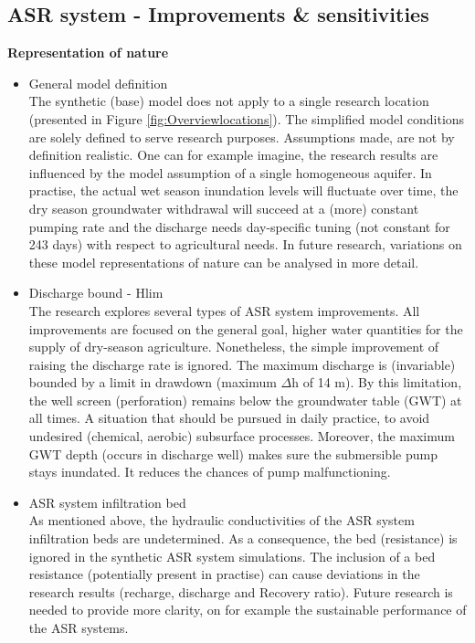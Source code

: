 \subsection{ASR system - Improvements \& sensitivities} 
\textbf{Representation of nature}
\begin{itemize}
\item{General model definition} \\
The synthetic (base) model does not apply to a single research location (presented in Figure \ref{fig:Overviewlocations}). The simplified model conditions are solely defined to serve research purposes. Assumptions made, are not by definition realistic. One can for example imagine, the research results are influenced by the model assumption of a single homogeneous aquifer. In practise, the actual wet season inundation levels will fluctuate over time, the dry season groundwater withdrawal will succeed at a (more) constant pumping rate and the discharge needs day-specific tuning (not constant for 243 days) with respect to agricultural needs. In future research, variations on these model representations of nature can be analysed in more detail. 
\item{Discharge bound - Hlim} \\
The research explores several types of ASR system improvements. All improvements are focused on the general goal, higher water quantities for the supply of dry-season agriculture. Nonetheless, the simple improvement of raising the discharge rate is ignored. The maximum discharge is (invariable) bounded by a limit in drawdown (maximum $\Delta$h of 14 m). By this limitation, the well screen (perforation) remains below the groundwater table (GWT) at all times. A situation that should be pursued in daily practice, to avoid undesired (chemical, aerobic) subsurface processes. Moreover, the maximum GWT depth (occurs in discharge well) makes sure the submersible pump stays inundated. It reduces the chances of pump malfunctioning. 
\item{ASR system infiltration bed} \\
As mentioned above, the hydraulic conductivities of the ASR system infiltration beds are undetermined. As a consequence, the bed (resistance) is ignored in the synthetic ASR system simulations. The inclusion of a bed resistance (potentially present in practise) can cause deviations in the research results (recharge, discharge and Recovery ratio). Future research is needed to provide more clarity, on for example the sustainable performance of the ASR systems. \\ 
\end{itemize}
